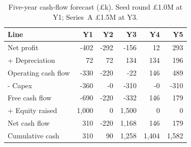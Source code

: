\begin{table}[H]
\centering
\small
\caption{Five-year cash-flow forecast (\pounds k). Seed round 
\pounds1.0M at Y1; Series~A 
\pounds1.5M at Y3.}
\label{tab:cashflow}
\begin{tabular}{lrrrrr}
\toprule
\textbf{Line} & \textbf{Y1} & \textbf{Y2} & \textbf{Y3} & \textbf{Y4} & \textbf{Y5} \\
\midrule
Net profit & -402 & -292 & -156 & 12 & 293 \\
+ Depreciation & 72 & 72 & 134 & 134 & 196 \\
Operating cash flow & -330 & -220 & -22 & 146 & 489 \\
- Capex & -360 & -0 & -310 & -0 & -310 \\
Free cash flow & -690 & -220 & -332 & 146 & 179 \\
+ Equity raised & 1,000 & 0 & 1,500 & 0 & 0 \\
Net cash flow & 310 & -220 & 1,168 & 146 & 179 \\
Cumulative cash & 310 & 90 & 1,258 & 1,404 & 1,582 \\
\bottomrule
\end{tabular}
\end{table}
